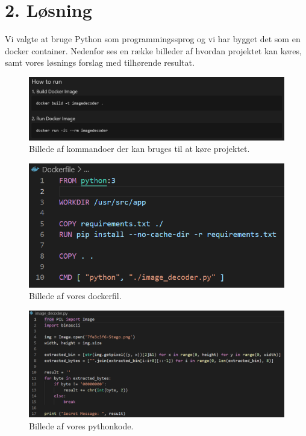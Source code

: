 \documentclass[10pt]{report}
\begin{document}
\chapter*{2. Løsning}
\pagestyle{fancy}
\noindent Vi valgte at bruge Python som programmingssprog og vi har bygget det som en docker container. Nedenfor ses en række billeder af hvordan projektet kan køres, samt vores løsnings forslag med tilhørende resultat.

\begin{figure}[H]
  \centering
  \includegraphics[width=\textwidth]{HowToRun.png}
  \caption{Billede af kommandoer der kan bruges til at køre projektet.}
\end{figure}

\begin{figure}[H]
  \centering
  \includegraphics[width=\textwidth]{Dockerfile.png}
  \caption{Billede af vores dockerfil.}
\end{figure}

\begin{figure}[H]
  \centering
  \includegraphics[width=\textwidth]{Pythonkode.png}
  \caption{Billede af vores pythonkode.}
\end{figure}
\end{document}
